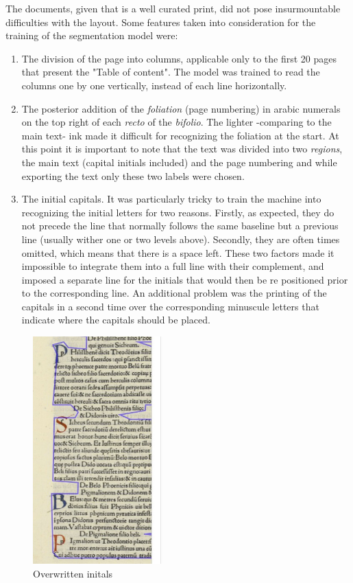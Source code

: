 \documentclass[12pt,twoside]{article}
\begin{document}
The documents, given that is a well curated print, did not pose insurmountable difficulties with the layout. Some features taken into consideration for the training of the segmentation model were:
\begin{enumerate}
    \item The division of the page into columns, applicable only to the first 20 pages that present the "Table of content". The model was trained to read the columns one by one vertically, instead of each line horizontally.
    \item  The posterior addition of the \textit{foliation} (page numbering) in arabic numerals on the top right of each \textit{recto} of the \textit{bifolio}. The lighter -comparing to the main text- ink  made it difficult for recognizing the foliation at the start. At this point it is important to note that the text was divided into two \textit{regions}, the main text (capital initials included) and the page numbering and while exporting the text only these two labels were chosen.
    \item The initial capitals. It was particularly tricky to train the machine into recognizing the initial letters for two reasons. Firstly, as expected, they do not precede the line that normally follows the same baseline but a previous line (usually wither one or two levels above). Secondly, they are often times omitted, which means that there is a space left. These two factors made it impossible to integrate them into a full line with their complement, and imposed a separate line for the initials that would then be re positioned prior to the corresponding line. 
    An additional problem was the printing of the capitals in a second time over the corresponding minuscule letters that indicate where the capitals should be placed. 
 \end{enumerate}   
 
\begin{figure}[h!]
    \centering
    \includegraphics[width=5cm]{initial_capitals.jpg}
    \caption{Overwritten initals}
    \label{fig:PremFigure}
\end{figure}
\end{document}
